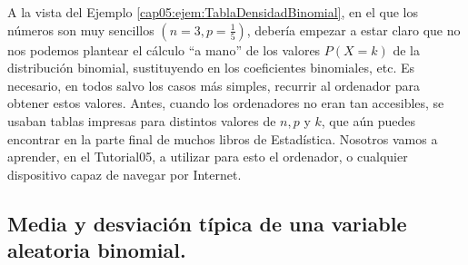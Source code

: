 A la vista del Ejemplo \ref{cap05:ejem:TablaDensidadBinomial}, en el que los números son muy sencillos  $\left(n=3, p=\frac{1}{5}\right)$, debería empezar a estar claro que no nos podemos plantear el cálculo ``a mano'' de los valores $P(X=k)$ de la distribución binomial, sustituyendo en los coeficientes binomiales, etc. Es necesario, en todos salvo los casos más simples, recurrir al ordenador para obtener estos valores. Antes, cuando los ordenadores no eran tan accesibles, se usaban tablas impresas para distintos valores de $n, p$ y $k$, que aún puedes encontrar en la parte final de muchos libros de Estadística. Nosotros vamos a aprender, en el Tutorial05, a utilizar para esto el ordenador, o cualquier dispositivo capaz de navegar por Internet.

\subsection*{Media y desviación típica de una variable aleatoria binomial.}

